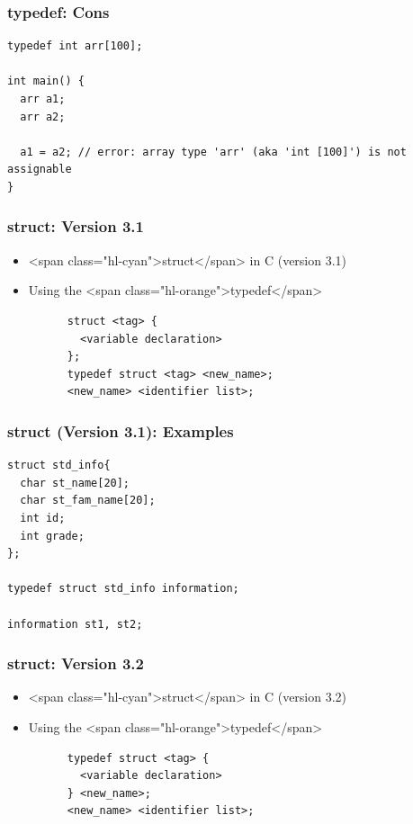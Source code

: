 \documentclass{../c-lecture}
\begin{document}
\begin{frame}[fragile]
  \frametitle{typedef: Cons}
  \begin{verbatim}
typedef int arr[100];

int main() {
  arr a1;
  arr a2;

  a1 = a2; // error: array type 'arr' (aka 'int [100]') is not assignable
}
  \end{verbatim}
\end{frame}

\begin{frame}[fragile]
  \frametitle{struct: Version 3.1}
  \begin{itemize}
    \item <span class="hl-cyan">struct</span> in C (version 3.1)
    \item Using the <span class="hl-orange">typedef</span>
    \begin{verbatim}
      struct <tag> {
        <variable declaration>
      };
      typedef struct <tag> <new_name>;
      <new_name> <identifier list>;
    \end{verbatim}
  \end{itemize}
\end{frame}

\begin{frame}[fragile]
  \frametitle{struct (Version 3.1): Examples}
  \begin{verbatim}
struct std_info{
  char st_name[20];
  char st_fam_name[20];
  int id;
  int grade;
};

typedef struct std_info information;

information st1, st2;
  \end{verbatim}
\end{frame}

\begin{frame}[fragile]
  \frametitle{struct: Version 3.2}
  \begin{itemize}
    \item <span class="hl-cyan">struct</span> in C (version 3.2)
    \item Using the <span class="hl-orange">typedef</span>
    \begin{verbatim}
      typedef struct <tag> {
        <variable declaration>
      } <new_name>;
      <new_name> <identifier list>;
    \end{verbatim}
  \end{itemize}
\end{frame}
\end{document}
